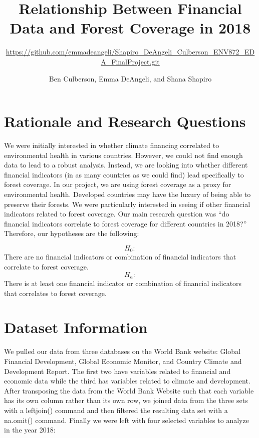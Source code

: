 \documentclass[
  12pt,
]{article}
\title{Relationship Between Financial Data and Forest Coverage in 2018}
\subtitle{\url{https://github.com/emmadeangeli/Shapiro_DeAngeli_Culberson_ENV872_EDA_FinalProject.git}}
\author{Ben Culberson, Emma DeAngeli, and Shana Shapiro}
\date{}
\begin{document}
\maketitle

\newpage
\tableofcontents 
\newpage
\listoffigures
\newpage

\hypertarget{rationale-and-research-questions}{%
\section{Rationale and Research
Questions}\label{rationale-and-research-questions}}

We were initially interested in whether climate financing correlated to
environmental health in various countries. However, we could not find
enough data to lead to a robust analysis. Instead, we are looking into
whether different financial indicators (in as many countries as we could
find) lead specifically to forest coverage. In our project, we are using
forest coverage as a proxy for environmental health. Developed countries
may have the luxury of being able to preserve their forests. We were
particularly interested in seeing if other financial indicators related
to forest coverage. Our main research question was ``do financial
indicators correlate to forest coverage for different countries in
2018?'' Therefore, our hypotheses are the following:

\[H_0:\] There are no financial indicators or combination of financial
indicators that correlate to forest coverage. \[H_a:\] There is at least
one financial indicator or combination of financial indicators that
correlates to forest coverage.

\newpage

\hypertarget{dataset-information}{%
\section{Dataset Information}\label{dataset-information}}

We pulled our data from three databases on the World Bank website:
Global Financial Development, Global Economic Monitor, and Country
Climate and Development Report. The first two have variables related to
financial and economic data while the third has variables related to
climate and development. After transposing the data from the World Bank
Website such that each variable has its own column rather than its own
row, we joined data from the three sets with a leftjoin() command and
then filtered the resulting data set with a na.omit() command. Finally
we were left with four selected variables to analyze in the year 2018:
\end{document}
